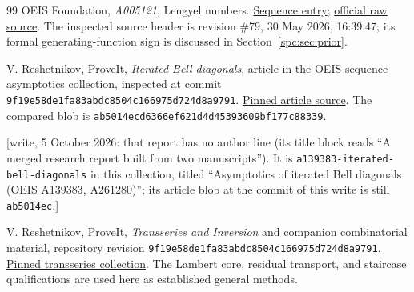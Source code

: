\documentclass[11pt,letterpaper]{article}
\theoremstyle{definition}\newtheorem{definition}[theorem]{Definition}
\theoremstyle{remark}\newtheorem{remark}[theorem]{Remark}
\newcommand{\file}[1]{\nolinkurl{#1}}
\begin{document}
\begin{thebibliography}{99}
OEIS Foundation, \emph{A005121}, Lengyel numbers.
\href{https://oeis.org/A005121}{Sequence entry};
\href{https://raw.githubusercontent.com/oeis/oeisdata/main/seq/A005/A005121.seq}{official raw source}.
The inspected source header is revision \#79, 30 May 2026, 16:39:47; its formal generating-function sign is discussed in Section~\ref{spc:sec:prior}.

V. Reshetnikov, ProveIt, \emph{Iterated Bell diagonals}, article in the OEIS sequence asymptotics collection, inspected at commit
\texttt{9f19e58de1fa83abdc8504c166975d724d8a9791}.
\href{https://github.com/VladimirReshetnikov/ProveIt/blob/9f19e58de1fa83abdc8504c166975d724d8a9791/SetTheory/Cardinals/docs/reports/generating-functions-and-asymptotics/oeis-sequence-asymptotics/a139383-iterated-bell-diagonals/article.tex}{Pinned article source}.
The compared blob is \texttt{ab5014ecd6366ef621d4d45393609bf177c88339}.
\par\textup{[write, 5 October 2026: that report has no author line (its title block reads ``A merged research report built from two manuscripts''). It is \file{a139383-iterated-bell-diagonals} in this collection, titled ``Asymptotics of iterated Bell diagonals (OEIS A139383, A261280)''; its article blob at the commit of this write is still \texttt{ab5014ec}.]}

V. Reshetnikov, ProveIt, \emph{Transseries and Inversion} and companion combinatorial material, repository revision
\texttt{9f19e58de1fa83abdc8504c166975d724d8a9791}.
\href{https://github.com/VladimirReshetnikov/ProveIt/tree/9f19e58de1fa83abdc8504c166975d724d8a9791/Analysis/Transseries/docs/series-and-transseries}{Pinned transseries collection}.
The Lambert core, residual transport, and staircase qualifications are used here as established general methods.
\end{thebibliography}
\end{document}
